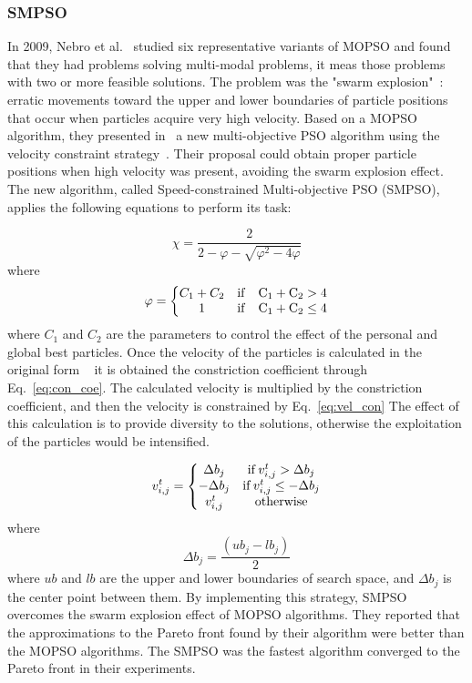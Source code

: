 \subsubsection{SMPSO}

In 2009, Nebro et al.~\cite{nebro2009smpso} studied six representative variants of MOPSO and found that they had problems solving multi-modal problems, it meas those problems with two or more feasible solutions. The problem was the "swarm explosion"~\cite{clerc2002particle}: erratic movements toward the upper and lower boundaries of particle positions that occur when particles acquire very high velocity. Based on a MOPSO algorithm, they presented in~\cite{nebro2009smpso} a new multi-objective PSO algorithm using the velocity constraint strategy~\cite{clerc2002particle}. Their proposal could obtain proper particle positions when high velocity was present, avoiding the swarm explosion effect. The new algorithm, called Speed-constrained Multi-objective PSO (SMPSO), applies the following equations to perform its task:

\begin{equation} \label{eq:con_coe}
\chi = \frac{2}{2 -\varphi - \sqrt{\varphi^2 -4\varphi}}
\end{equation}
where
\begin{equation}
\varphi = \left\{ \begin{matrix}
    C_1 +C_2 & \rm{if} \quad C_1 +C_2 > 4 \\ 
    1 & \rm{if} \quad C_1 +C_2 \leq 4
\end{matrix} \right.
\end{equation}
where $C_1$ and $C_2$ are the parameters to control the effect of the personal and global best particles.
Once the velocity of the particles is calculated in the original form ~\cite{nebro2009smpso} it is obtained the constriction coefficient through Eq.~\ref{eq:con_coe}. The calculated velocity is multiplied by the constriction coefficient, and then the velocity is constrained by Eq.~\ref{eq:vel_con} The effect of this calculation is to provide diversity to the solutions, otherwise the exploitation of the particles would be intensified.

\begin{equation} \label{eq:vel_con}
v_{i, j}^t = \left\{ \begin{matrix}
    \Delta b_j & {\rm if} \, v_{i,j}^t > \Delta b_j\\
    -\Delta b_j & {\rm if} \, v_{i,j}^t \leq -\Delta b_j\\
    v_{i,j}^t & {\rm otherwise}
\end{matrix} \right.
\end{equation}
where
\begin{equation}
    \Delta b_j = \frac{(ub_j -lb_j)}{2}
\end{equation}
where $ub$ and $lb$ are the upper and lower boundaries of search space, and $\Delta b_j$ is the center point between them.
By implementing this strategy, SMPSO overcomes the swarm explosion effect of MOPSO algorithms. They reported that the approximations to the Pareto front found by their algorithm were better than the MOPSO algorithms. The SMPSO was the fastest algorithm converged to the Pareto front in their experiments.

